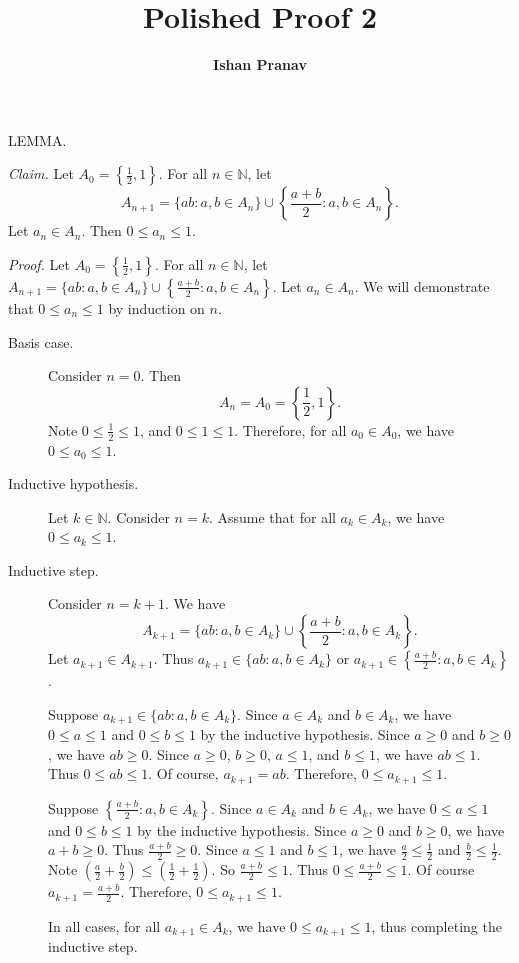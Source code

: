 \documentclass[9pt]{article}
\title{Polished Proof 2}
\author{\textbf{Ishan Pranav}}
\begin{document}
\maketitle
\noindent\small{LEMMA.}\newline

\noindent\textit{Claim. }Let $A_0=\left\{\frac{1}{2},1
\right\}$. For all $n\in\mathbb{N}$, let
\[A_{n+1}=\{ab:a,b\in A_n\}\cup\left\{\frac{a+b}{2}:a,b\in A_n\right\}.\]
Let $a_n\in A_n$. Then $0\leq a_n\leq 1$.\newline

\noindent\textit{Proof. }Let $A_0=\left\{\frac{1}{2},1
\right\}$. For all $n\in\mathbb{N}$, let
$A_{n+1}=\{ab:a,b\in A_n\}\cup\left\{\frac{a+b}{2}:a,b\in A_n\right\}$.
Let $a_n\in A_n$. We will demonstrate that $0\leq a_n\leq 1$ by induction on $n$.\newline

\begin{description}
\item[Basis case.] Consider $n=0$. Then
\[A_n=A_0=\left\{\frac{1}{2},1
\right\}.\]
Note $0\leq\frac{1}{2}\leq 1$, and $0\leq 1\leq 1$. Therefore, for all $a_0\in A_0$, we have $0\leq a_0\leq 1$.
\item[Inductive hypothesis.] Let $k\in\mathbb{N}$. Consider $n=k$. Assume that for all $a_k\in A_k$, we have $0\leq a_k\leq 1$.
\item[Inductive step.] Consider $n=k+1$. We have 
\[A_{k+1}=\{ab:a,b\in A_k\}\cup\left\{\frac{a+b}{2}:a,b\in A_k\right\}.\]
Let $a_{k+1}\in A_{k+1}$. Thus $a_{k+1}\in\{ab:a,b\in A_k\}$ or $a_{k+1}\in\left\{\frac{a+b}{2}:a,b\in A_k\right\}$.\newline

Suppose $a_{k+1}\in\{ab:a,b\in A_k\}$. Since $a\in A_k$ and $b\in A_k$, we have $0\leq a\leq 1$ and $0\leq b\leq 1$ by the inductive hypothesis. Since $a\geq 0$ and $b\geq 0$, we have $ab\geq 0$. Since $a\geq 0$, $b\geq 0$, $a\leq 1$, and $b\leq 1$, we have $ab\leq 1$. Thus $0\leq ab\leq 1$. Of course, $a_{k+1}=ab$. Therefore, $0\leq a_{k+1}\leq 1$.\newline

Suppose $\left\{\frac{a+b}{2}:a,b\in A_k\right\}$. Since $a\in A_k$ and $b\in A_k$, we have $0\leq a\leq 1$ and $0\leq b\leq 1$ by the inductive hypothesis. 
Since $a\geq 0$ and $b\geq 0$, we have $a+b\geq 0$. Thus $\frac{a+b}{2}\geq 0$. Since $a\leq 1$ and $b\leq 1$, we have $\frac{a}{2}\leq\frac{1}{2}$ and $\frac{b}{2}\leq\frac{1}{2}$. Note $\left(\frac{a}{2}+\frac{b}{2}\right)\leq\left(\frac{1}{2}+\frac{1}{2}\right)$. So $\frac{a+b}{2}\leq 1$. Thus $0\leq\frac{a+b}{2}\leq 1$. Of course $a_{k+1}=\frac{a+b}{2}$. Therefore, $0\leq a_{k+1}\leq 1$.\newline

In all cases, for all $a_{k+1}\in A_k$, we have $0\leq a_{k+1}\leq 1$, thus completing the inductive step.\newline

\end{description}
\end{document}
